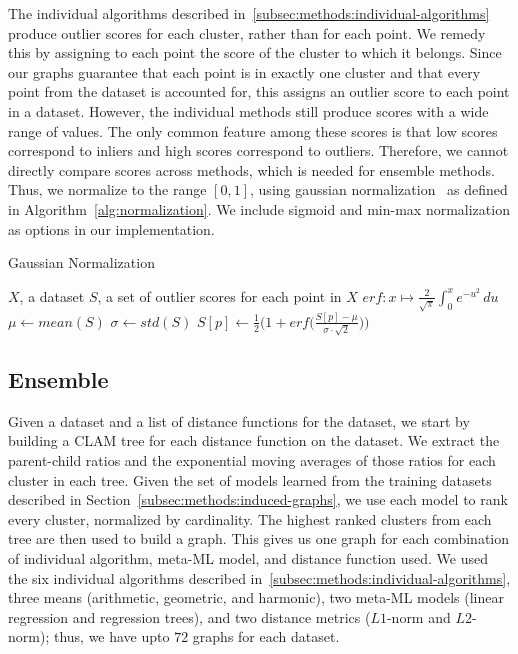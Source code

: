 The individual algorithms described in~\ref{subsec:methods:individual-algorithms} produce outlier scores for each cluster, rather than for each point.
We remedy this by assigning to each point the score of the cluster to which it belongs.
Since our graphs guarantee that each point is in exactly one cluster and that every point from the dataset is accounted for, this assigns an outlier score to each point in a dataset.
However, the individual methods still produce scores with a wide range of values.
The only common feature among these scores is that low scores correspond to inliers and high scores correspond to outliers.
Therefore, we cannot directly compare scores across methods, which is needed for ensemble methods.
Thus, we normalize to the range $[0, 1]$, using gaussian normalization~\cite{kriegel2011interpreting} as defined in Algorithm~\ref{alg:normalization}.
We include sigmoid and min-max normalization as options in our implementation.

\begin{algorithm}[h]
    \caption{Gaussian Normalization}
    \label{alg:normalization}
\begin{algorithmic}[1]
    \REQUIRE $X$, a dataset
    \REQUIRE $S$, a set of outlier scores for each point in $X$
    \STATE $erf: x \mapsto \frac{2}{\sqrt{\pi}} \int_{0}^{x} e^{-u^2} \,du $
    \STATE $\mu \gets mean(S)$
    \STATE $\sigma \gets std(S)$
        \STATE $S[p] \gets \frac{1}{2} \Big( 1 + erf \big(\frac{S[p] - \mu}{\sigma \cdot \sqrt{2}}\big) \Big) $
    \ENDFOR
\end{algorithmic}
\end{algorithm}

\subsection{Ensemble}
\label{subsec:methods:ensemble}

Given a dataset and a list of distance functions for the dataset, we start by building a CLAM tree for each distance function on the dataset.
We extract the parent-child ratios and the exponential moving averages of those ratios for each cluster in each tree.
Given the set of models learned from the training datasets described in Section~\ref{subsec:methods:induced-graphs}, we use each model to rank every cluster, normalized by cardinality.
The highest ranked clusters from each tree are then used to build a graph.
This gives us one graph for each combination of individual algorithm, meta-ML model, and distance function used.
We used the six individual algorithms described in~\ref{subsec:methods:individual-algorithms}, three means (arithmetic, geometric, and harmonic), two meta-ML models (linear regression and regression trees), and two distance metrics ($L1$-norm and $L2$-norm);
thus, we have upto $72$ graphs for each dataset.

